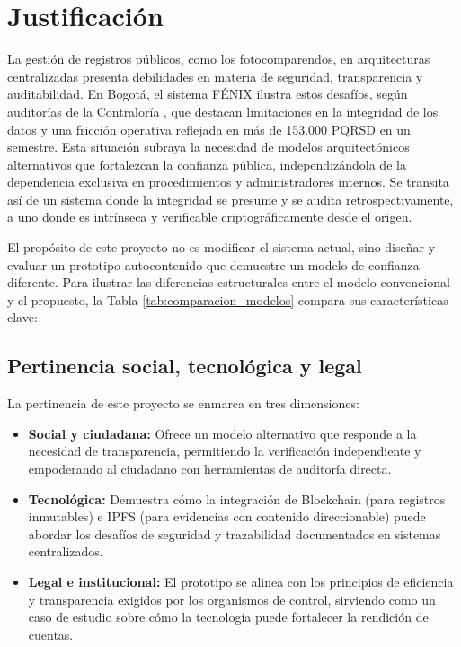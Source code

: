 \section{\large Justificación}
La gestión de registros públicos, como los fotocomparendos, en arquitecturas centralizadas presenta debilidades en materia de seguridad, transparencia y auditabilidad. En Bogotá, el sistema FÉNIX ilustra estos desafíos, según auditorías de la Contraloría \parencite{Informe170100005424} \parencite{InformeCumplimiento90}, que destacan limitaciones en la integridad de los datos y una fricción operativa reflejada en más de 153.000 PQRSD en un semestre. Esta situación subraya la necesidad de modelos arquitectónicos alternativos que fortalezcan la confianza pública, independizándola de la dependencia exclusiva en procedimientos y administradores internos. Se transita así de un sistema donde la integridad se presume y se audita retrospectivamente, a uno donde es intrínseca y verificable criptográficamente desde el origen.

El propósito de este proyecto no es modificar el sistema actual, sino diseñar y evaluar un prototipo autocontenido que demuestre un modelo de confianza diferente. Para ilustrar las diferencias estructurales entre el modelo convencional y el propuesto, la Tabla \ref{tab:comparacion_modelos} compara sus características clave:



\subsection{Pertinencia social, tecnológica y legal}
La pertinencia de este proyecto se enmarca en tres dimensiones:
\begin{itemize}
\item \textbf{Social y ciudadana:} Ofrece un modelo alternativo que responde a la necesidad de transparencia, permitiendo la verificación independiente y empoderando al ciudadano con herramientas de auditoría directa.
\item \textbf{Tecnológica:} Demuestra cómo la integración de Blockchain (para registros inmutables) e IPFS (para evidencias con contenido direccionable) puede abordar los desafíos de seguridad y trazabilidad documentados en sistemas centralizados.
\item \textbf{Legal e institucional:} El prototipo se alinea con los principios de eficiencia y transparencia exigidos por los organismos de control, sirviendo como un caso de estudio sobre cómo la tecnología puede fortalecer la rendición de cuentas.
\end{itemize}

